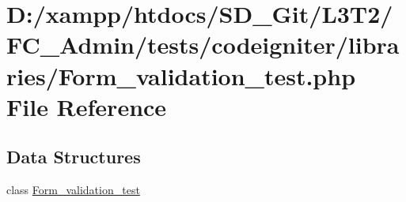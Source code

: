 \hypertarget{_admin_2tests_2codeigniter_2libraries_2_form__validation__test_8php}{}\section{D\+:/xampp/htdocs/\+S\+D\+\_\+\+Git/\+L3\+T2/\+F\+C\+\_\+\+Admin/tests/codeigniter/libraries/\+Form\+\_\+validation\+\_\+test.php File Reference}
\label{_admin_2tests_2codeigniter_2libraries_2_form__validation__test_8php}
\subsection*{Data Structures}
\begin{DoxyCompactItemize}
\item 
class \hyperlink{class_form__validation__test}{Form\+\_\+validation\+\_\+test}
\end{DoxyCompactItemize}
